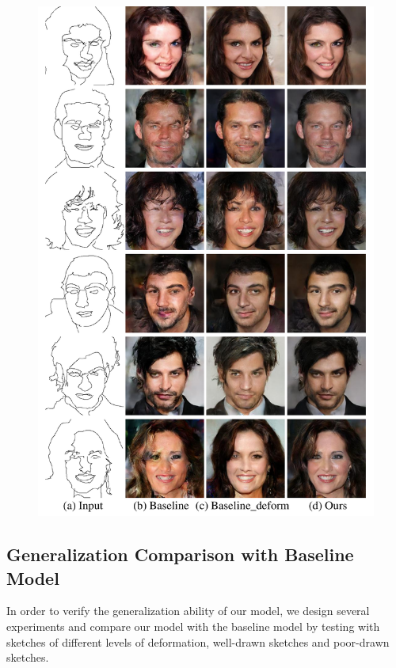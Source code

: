 \begin{figure}
	\includegraphics[width=\linewidth]{figs/generalization_examples}
	\caption{}
	\label{fig:generative_quality}
\end{figure}

\subsection{Generalization Comparison with Baseline Model}

In order to verify the generalization ability of our model, we design several experiments and compare our model with the baseline model by testing with sketches of different levels of deformation, well-drawn sketches and poor-drawn sketches.


